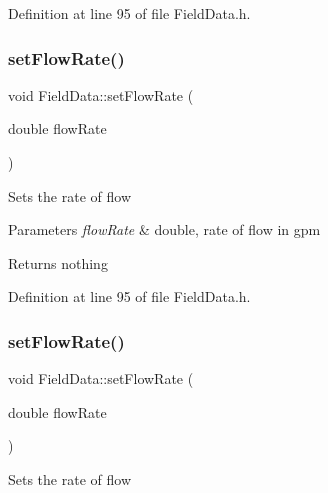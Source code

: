 Definition at line 95 of file Field\+Data.\+h.

\mbox{\label{class_field_data_ad25c3e5a76b4e493e82d3f70cc3c0ed9}} 
\subsubsection{\texorpdfstring{set\+Flow\+Rate()}{setFlowRate()}\hspace{0.1cm}{\footnotesize\ttfamily [2/3]}}
{\footnotesize\ttfamily void Field\+Data\+::set\+Flow\+Rate (\begin{DoxyParamCaption}\item[{double}]{flow\+Rate }\end{DoxyParamCaption})\hspace{0.3cm}{\ttfamily [inline]}}

Sets the rate of flow


\begin{DoxyParams}{Parameters}
{\em flow\+Rate} & double, rate of flow in gpm\\
\hline
\end{DoxyParams}
\begin{DoxyReturn}{Returns}
nothing 
\end{DoxyReturn}


Definition at line 95 of file Field\+Data.\+h.

\mbox{\label{class_field_data_ad25c3e5a76b4e493e82d3f70cc3c0ed9}} 
\subsubsection{\texorpdfstring{set\+Flow\+Rate()}{setFlowRate()}\hspace{0.1cm}{\footnotesize\ttfamily [3/3]}}
{\footnotesize\ttfamily void Field\+Data\+::set\+Flow\+Rate (\begin{DoxyParamCaption}\item[{double}]{flow\+Rate }\end{DoxyParamCaption})\hspace{0.3cm}{\ttfamily [inline]}}

Sets the rate of flow


